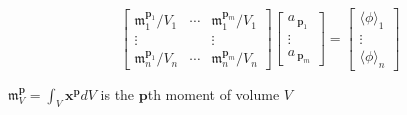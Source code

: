 \documentclass{article}
\newcommand{\moment}{\mathfrak{m}}
\newcommand{\vect}{\mathbf}
\begin{document}
\begin{equation*}
	\begin{bmatrix}
		\moment_1^{\vect{p}_1}/V_1 & \cdots & \moment_1^{\vect{p}_m}/V_1 \\
		\vdots & & \vdots \\
		\moment_n^{\vect{p}_1}/V_n & \cdots & \moment_n^{\vect{p}_m}/V_n
	\end{bmatrix}
	\begin{bmatrix}
		a_{\:\vect{p}_1} \\
		\vdots \\
		a_{\:\vect{p}_m}
	\end{bmatrix}
	=
	\begin{bmatrix}
		\langle \phi \rangle_1 \\
		\vdots \\
		\langle \phi \rangle_n
	\end{bmatrix}
\end{equation*}

\hspace*{3em}$\moment_V^\vect{p} = \int_V \vect{x}^\vect{p} dV$ is the $\vect{p}$th moment of volume $V$
\end{document}
